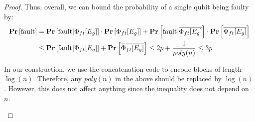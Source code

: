 \documentclass[manuscript,screen,review]{acmart}
\begin{document}
{\begin{proof}
  Thus, overall, we can bound the probability of a single qubit being faulty by:
  \begin{equation*}
    \begin{split}
      \mathbf{Pr} \left[ \text{fault}  \right] &=  \mathbf{Pr} \left[ \text{fault} |  \Phi_{ft}[E_{g}]  \right]\cdot \mathbf{Pr} \left[ \Phi_{ft}[E_{g}] \right] + \mathbf{Pr} \left[ \text{fault} | \overline{\Phi_{ft}[E_{g}]}  \right]\cdot \mathbf{Pr} \left[ \overline{\Phi_{ft}[E_{g}]} \right]\\
      &\le  \mathbf{Pr} \left[ \text{fault} |  \Phi_{ft}[E_{g}]  \right] + \mathbf{Pr} \left[ \overline{\Phi_{ft}[E_{g}]} \right] \le 2p + \frac{1}{poly(n)} \le 3p
    \end{split}
  \end{equation*}

  \begin{remark}
In our construction, we use the concatenation code to encode blocks of length $\log(n)$. Therefore, any $poly(n)$ in the above should be replaced by $\log(n)$. However, this does not affect anything since the inequality does not depend on $n$.
  \end{remark}


\end{proof}}
\end{document}
